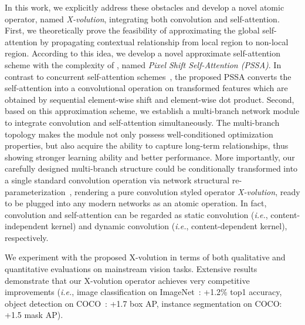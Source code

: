 \documentclass{article}
\begin{document}
In this work, we explicitly address these obstacles and develop a novel atomic operator, named \emph{X-volution}, integrating both convolution and self-attention.
First, we theoretically prove the feasibility of approximating the global self-attention by propagating contextual relationship from local region to non-local region.
According to this idea, we develop a novel approximate self-attention scheme with the complexity of , named \emph{Pixel Shift Self-Attention (PSSA)}.
In contrast to concurrent self-attention schemes~\cite{DBLP:conf/nips/VaswaniSPUJGKP17,DBLP:journals/corr/abs-2103-14030,DBLP:journals/corr/abs-2103-12731}, the proposed PSSA 
converts the self-attention into a convolutional operation on transformed features which are obtained by sequential element-wise shift and element-wise dot product. 
Second, based on this approximation scheme, we establish a multi-branch network module to integrate convolution and self-attention simultaneously.
The multi-branch topology makes the module not only possess well-conditioned optimization properties, but also acquire the ability to capture long-term relationships, thus showing stronger learning ability and better performance.
More importantly, 
our carefully designed multi-branch structure could be conditionally transformed into a single standard convolution operation via network structural re-parameterization~\cite{DBLP:journals/corr/abs-2101-03697}, rendering a pure convolution styled operator \emph{X-volution}, ready to be plugged into any modern networks as an atomic operation.
In fact, convolution and self-attention can be regarded as static convolution (\emph{i.e.}, content-independent kernel) and dynamic convolution (\emph{i.e.}, content-dependent kernel), respectively.







We experiment with the proposed X-volution in terms of both qualitative and quantitative evaluations on mainstream vision tasks.
Extensive results demonstrate that our X-volution operator achieves very competitive improvements (\emph{i.e.}, image classification on ImageNet~\cite{DBLP:journals/ijcv/RussakovskyDSKS15}: +1.2\% top1 accuracy, object detection on COCO~\cite{DBLP:conf/eccv/LinMBHPRDZ14}: +1.7 box AP, instance segmentation on COCO: +1.5 mask AP).
\end{document}
